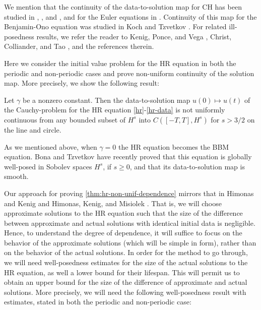We mention that the continuity of the data-to-solution map  for CH has 
been studied in  \cite{Himonas_2007_Non-uniform-con},
\cite{Himonas_2001_The-Cauchy-prob}, and 
\cite{Himonas:2005kx}, and for the Euler equations in 
\cite{Himonas_2009_Non-uniform-dep-euler}. Continuity of this map for  
the  Benjamin-Ono equation was studied in  Koch and  Tzvetkov 
\cite{Koch_2005_Nonlinear-wave-}. For related ill-posedness results, we 
refer the reader to Kenig, Ponce, and  Vega 
\cite{Kenig_2001_On-the-ill-pose}, Christ, Colliander, and Tao 
\cite{Christ_2003_Asymptotics-fre}, and the references 
therein.

Here we consider the initial value problem for the HR equation
in both the periodic and non-periodic cases
and prove non-uniform  continuity of the solution map. 
More precisely, we show the following result:
%
%
%
%
%
%
\begin{theorem}
\label{thm:hr-non-unif-dependence}
Let $\gamma$ be a nonzero constant. Then 
the data-to-solution map $u(0) \mapsto u(t)$ of the Cauchy-problem
for the HR equation
\eqref{hr}-\eqref{hr-data}
is not uniformly continuous
from any bounded subset of  $H^s$ into $C([-T, T], H^s)$
for $s>3/2$ on the line and circle.
%
\end{theorem}
%
%
%
As we mentioned above, when  $\gamma=0$ the HR equation
becomes the BBM equation.
Bona and Tzvetkov \cite{Bona_2009_Sharp-well-pose} have recently proved  that this equation  
is globally well-posed in  Sobolev spaces $H^s$, if $s \ge 0$,
and that its data-to-solution map is smooth.

%
Our approach  for proving \cref{thm:hr-non-unif-dependence}  
mirrors  that in Himonas and Kenig \cite{Himonas:2009fk} and 
Himonas, Kenig, and Misiolek \cite{Himonas_2009_Non-uniform-dep-per}.
That is, we will choose 
approximate solutions to the HR equation such that the size of the difference between approximate and actual solutions with 
identical initial data is negligible. Hence, to understand the degree of 
dependence, it will suffice to focus on the behavior of the approximate 
solutions (which will be simple in form), rather than on the behavior of the 
actual solutions. In order for the method to go through, we will 
need well-posedness estimates for  the size of the 
actual solutions to the HR equation, as well a 
lower bound for their lifespan. This will permit us to obtain an upper 
bound for the size of the difference of approximate and actual solutions. 
More precisely, we will need the following well-posedness result  with estimates,  
stated in both the  periodic and non-periodic case:


